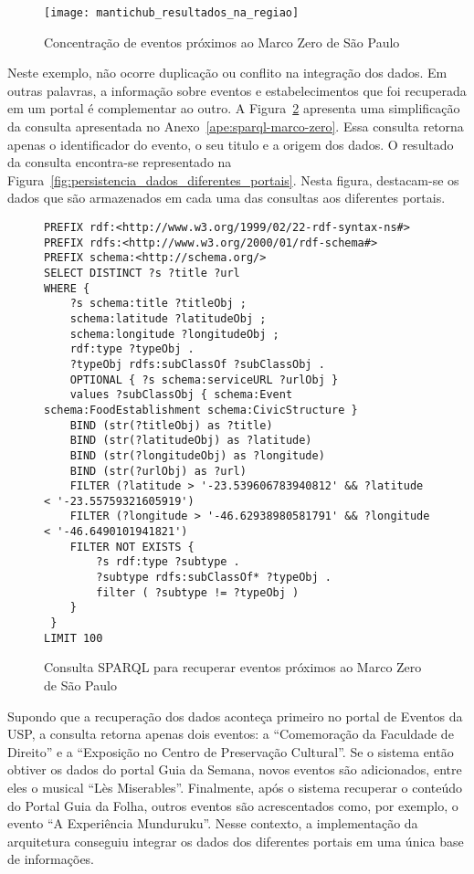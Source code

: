 \begin{figure}[!ht]
  \centering
  \texttt{[image: mantichub\_resultados\_na\_regiao]} 
  \caption{Concentração de eventos próximos ao Marco Zero de São Paulo}
  \label{fig:mantichub_resultados_na_regiao} 
\end{figure}

Neste exemplo, não ocorre duplicação ou conflito na integração dos dados. Em outras palavras, a informação sobre eventos e estabelecimentos que foi recuperada em um portal é complementar ao outro. A Figura~\ref{fig:sparql_portais} apresenta uma simplificação da consulta apresentada no Anexo~\ref{ape:sparql-marco-zero}.  Essa consulta retorna apenas o identificador do evento, o seu titulo e a origem dos dados. O resultado da consulta  encontra-se representado na Figura~\ref{fig:persistencia_dados_diferentes_portais}. Nesta figura, destacam-se os dados que são armazenados em cada uma das consultas aos diferentes portais.


\begin{figure}[!ht]
    \begin{lstlisting}[language=SPARQL]
PREFIX rdf:<http://www.w3.org/1999/02/22-rdf-syntax-ns#>
PREFIX rdfs:<http://www.w3.org/2000/01/rdf-schema#>
PREFIX schema:<http://schema.org/>
SELECT DISTINCT ?s ?title ?url
WHERE {
	?s schema:title ?titleObj ;
	schema:latitude ?latitudeObj ;
	schema:longitude ?longitudeObj ;
	rdf:type ?typeObj .
	?typeObj rdfs:subClassOf ?subClassObj .
	OPTIONAL { ?s schema:serviceURL ?urlObj }
	values ?subClassObj { schema:Event schema:FoodEstablishment schema:CivicStructure } 
	BIND (str(?titleObj) as ?title)
	BIND (str(?latitudeObj) as ?latitude)
	BIND (str(?longitudeObj) as ?longitude)
	BIND (str(?urlObj) as ?url)
	FILTER (?latitude > '-23.539606783940812' && ?latitude < '-23.55759321605919')
	FILTER (?longitude > '-46.62938980581791' && ?longitude < '-46.6490101941821')
	FILTER NOT EXISTS {
		?s rdf:type ?subtype .
		?subtype rdfs:subClassOf* ?typeObj .
		filter ( ?subtype != ?typeObj )
	}
 }
LIMIT 100
    \end{lstlisting}
    \caption{Consulta SPARQL para recuperar eventos próximos ao Marco Zero de São Paulo}
    \label{fig:sparql_portais} 
\end{figure}

Supondo que a recuperação dos dados aconteça primeiro no portal de Eventos da USP, a consulta retorna apenas dois eventos: a ``Comemoração da Faculdade de Direito'' e a ``Exposição no Centro de Preservação Cultural''. Se o sistema então obtiver os dados do portal Guia da Semana, novos eventos são adicionados, entre eles o musical ``Lès Miserables''. Finalmente, após o sistema recuperar o conteúdo do Portal Guia da Folha, outros eventos são acrescentados como, por exemplo, o evento ``A Experiência Munduruku''. Nesse contexto, a implementação da arquitetura conseguiu integrar os dados dos diferentes portais em uma única base de informações.

